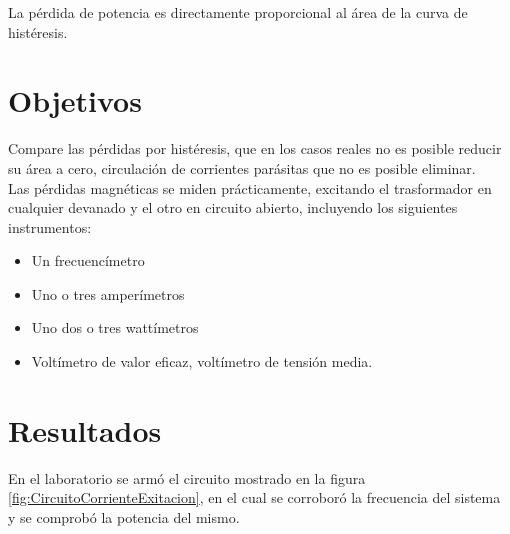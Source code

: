 \documentclass[]{article}
\begin{document}
La pérdida de potencia es directamente proporcional al área de la curva de histéresis.\cite{WikiHisteresis} \\

		
	\section{Objetivos}
	
  Compare las pérdidas por histéresis, que en los casos reales no es posible reducir su área a cero, circulación de corrientes parásitas que no es posible eliminar.\\
  
  Las pérdidas magnéticas se miden prácticamente, excitando el trasformador en cualquier devanado y el otro en circuito abierto, incluyendo los siguientes instrumentos:\\
  
  \begin{itemize}
  	\item   Un frecuencímetro
  	\item Uno o tres amperímetros
  	\item Uno dos o tres wattímetros
  	\item Voltímetro de valor eficaz, voltímetro de tensión media.
  \end{itemize}

    
	\section{Resultados}

En el laboratorio se armó el circuito mostrado en la figura \ref{fig:CircuitoCorrienteExitacion}, en el cual se corroboró la frecuencia del sistema y se comprobó la potencia del mismo.\\
\end{document}
